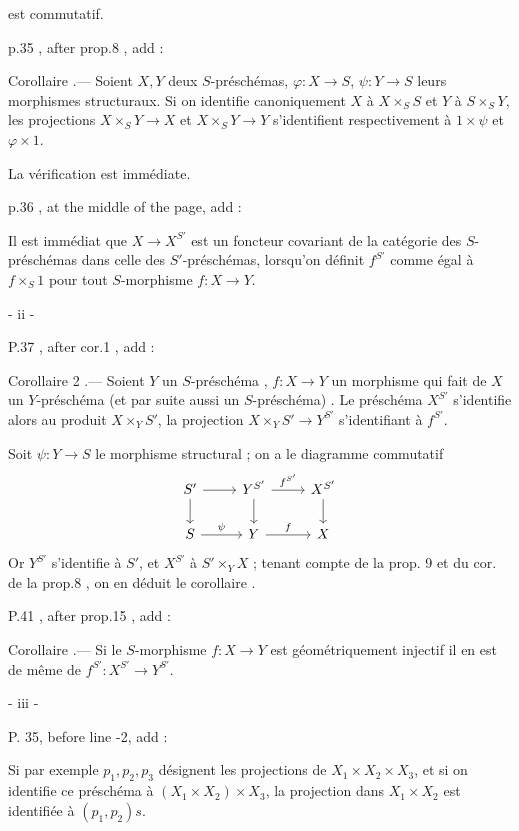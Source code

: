 est commutatif.

p.35 , after prop.8 , add :

Corollaire .— Soient $X, Y$ deux $S$-préschémas, $\varphi : X \to S$, $\psi : Y \to S$ leurs morphismes structuraux. Si on identifie canoniquement $X$ à $X \times_S S$ et $Y$ à $S \times_S Y$, les projections $X \times_S Y \to X$ et $X \times_S Y \to Y$ s'identifient respectivement à $1 \times \psi$ et $\varphi \times 1$.

La vérification est immédiate.

p.36 , at the middle of the page, add :

Il est immédiat que $X \to X^{S'}$ est un foncteur covariant de la catégorie des $S$-préschémas dans celle des $S'$-préschémas, lorsqu'on définit $f^{S'}$ comme égal à $f \times_S 1$ pour tout $S$-morphisme $f : X \to Y$.

\newpage


- ii -

P.37 , after cor.1 , add :

Corollaire 2 .— Soient $Y$ un $S$-préschéma , $f : X \to Y$ un morphisme qui fait de $X$ un $Y$-préschéma (et par suite aussi un $S$-préschéma) . Le préschéma $X^{S'}$ s'identifie alors au produit $X \times_Y S'$, la projection $X \times_Y S' \to Y^{S'}$ s'identifiant à $f^{S'}$.

Soit $\psi : Y \to S$ le morphisme structural ; on a le diagramme commutatif
$$
\begin{tikzcd}
S' \arrow[d] \arrow[r] & Y^{S'} \arrow[d] \arrow[r, "f^{S'}"] & X^{S'} \arrow[d] \\
S \arrow[r, "\psi"] & Y \arrow[r, "f"] & X
\end{tikzcd}
$$
Or $Y^{S'}$ s'identifie à $S'$, et $X^{S'}$ à $S' \times_Y X$ ; tenant compte de la prop. 9 et du cor. de la prop.8 , on en déduit le corollaire .

P.41 , after prop.15 , add :

Corollaire .— Si le $S$-morphisme $f : X \to Y$ est géométriquement injectif il en est de même de $f^{S'} : X^{S'} \to Y^{S'}$.

\newpage


- iii -

P. 35, before line -2, add :

Si par exemple $p_1, p_2, p_3$ désignent les projections de $X_1 \times X_2 \times X_3$, et si on identifie ce préschéma à $(X_1 \times X_2) \times X_3$, la projection dans $X_1 \times X_2$ est identifiée à $(p_1, p_2)s$.


